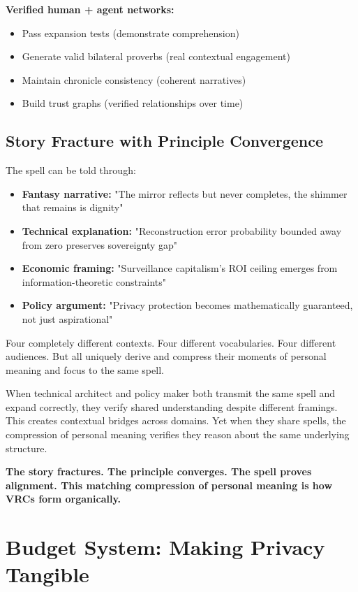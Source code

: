 \documentclass[11pt,a4paper]{article}
\theoremstyle{definition}
\begin{document}
\textbf{Verified human + agent networks:}

\begin{itemize}
    \item Pass expansion tests (demonstrate comprehension)
    \item Generate valid bilateral proverbs (real contextual engagement)
    \item Maintain chronicle consistency (coherent narratives)
    \item Build trust graphs (verified relationships over time)
\end{itemize}

\subsection{Story Fracture with Principle Convergence}

The spell can be told through:

\begin{itemize}
    \item \textbf{Fantasy narrative:} "The mirror reflects but never completes, the shimmer that remains is dignity"
    \item \textbf{Technical explanation:} "Reconstruction error probability bounded away from zero preserves sovereignty gap"
    \item \textbf{Economic framing:} "Surveillance capitalism's ROI ceiling emerges from information-theoretic constraints"
    \item \textbf{Policy argument:} "Privacy protection becomes mathematically guaranteed, not just aspirational"
\end{itemize}

Four completely different contexts. Four different vocabularies. Four different audiences. But all uniquely derive and compress their moments of personal meaning and focus to the same spell.

When technical architect and policy maker both transmit the same spell and expand correctly, they verify shared understanding despite different framings. This creates contextual bridges across domains. Yet when they share spells, the compression of personal meaning verifies they reason about the same underlying structure.

\textbf{The story fractures. The principle converges. The spell proves alignment. This matching compression of personal meaning is how VRCs form organically.}

\section{Budget System: Making Privacy Tangible}
\end{document}
